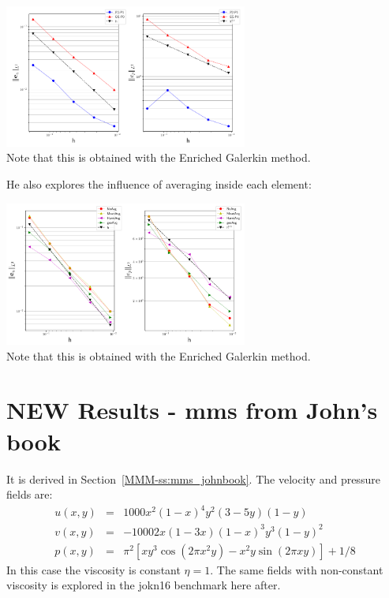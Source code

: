 \begin{center}
\includegraphics[width=8cm]{python_codes/fieldstone_120/images/bohm23a}\\
{\captionfont Note that this is obtained with the Enriched Galerkin method.}
\end{center}

He also explores the influence of averaging inside each element:
\begin{center}
\includegraphics[width=8cm]{python_codes/fieldstone_120/images/bohm23b}\\
{\captionfont Note that this is obtained with the Enriched Galerkin method.}
\end{center}








\newpage
\section*{NEW Results - mms from John's book}

It is derived in Section~\ref{MMM-ss:mms_johnbook}. The velocity and pressure fields are:
\begin{eqnarray}
u(x,y) &=& 1000 x^2(1-x)^4  y^2 (3-5y) (1-y) \\
v(x,y) &=& -1000 2x(1-3x) (1-x)^3  y^3(1-y)^2   \\
p(x,y) &=& \pi^2 [xy^3 \cos(2\pi x^2 y) - x^2y \sin(2\pi xy) ]+1/8
\end{eqnarray}
In this case the viscosity is constant $\eta=1$. The same fields 
with non-constant viscosity is explored in the jokn16 benchmark here after.

